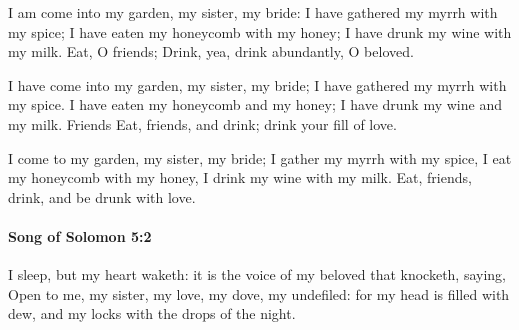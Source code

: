 			\begin{versebox}
					\item[BHS] 
					\item[LXX] 
					\item[ASV] I am come into my garden, my sister, my bride: I have gathered my myrrh with my spice; I have eaten my honeycomb with my honey; I have drunk my wine with my milk. Eat, O friends; Drink, yea, drink abundantly, O beloved.
					\item[NIV] I have come into my garden, my sister, my bride; I have gathered my myrrh with my spice. I have eaten my honeycomb and my honey; I have drunk my wine and my milk. Friends Eat, friends, and drink; drink your fill of love.
					\item[NRSV] I come to my garden, my sister, my bride; I gather my myrrh with my spice, I eat my honeycomb with my honey, I drink my wine with my milk. Eat, friends, drink, and be drunk with love.
			\end{versebox}

		\paragraph{Song of Solomon 5:2} %
			\label{SONGOFSOLOMON-5-2}

			I sleep, but my heart waketh: it is the voice of my beloved that knocketh, saying, Open to me, my sister, my love, my dove, my undefiled: for my head is filled with dew, and my locks with the drops of the night.

